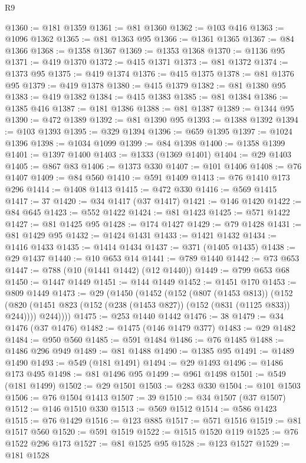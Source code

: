 \begin{lexlean}{R9}
\begin{coremodule}
@1360 := @181 @1359
@1361 := @81 @1360
@1362 := @103 @416
@1363 := @1096 @1362
@1365 := @81 @1363 @95
@1366 := @1361 @1365
@1367 := @84 @1366
@1368 := @1358 @1367
@1369 := @1353 @1368
@1370 := @1136 @95
@1371 := @419 @1370
@1372 := @415 @1371
@1373 := @81 @1372
@1374 := @1373 @95
@1375 := @419 @1374
@1376 := @415 @1375
@1378 := @81 @1376 @95
@1379 := @419 @1378
@1380 := @415 @1379
@1382 := @81 @1380 @95
@1383 := @419 @1382
@1384 := @415 @1383
@1385 := @81 @1384
@1386 := @1385 @416
@1387 := @181 @1386
@1388 := @81 @1387
@1389 := @1344 @95
@1390 := @472 @1389
@1392 := @81 @1390 @95
@1393 := @1388 @1392
@1394 := @103 @1393
@1395 := @329 @1394
@1396 := @659 @1395
@1397 := @1024 @1396
@1398 := @1034 @1099
@1399 := @84 @1398
@1400 := @1358 @1399
@1401 := @1397 @1400
@1403 := @1333 (@1369 @1401)
@1404 := @29 @1403
@1405 := @867 @83
@1406 := @1373 @330
@1407 := @101 @1406
@1408 := @76 @1407
@1409 := @84 @560
@1410 := @591 @1409
@1413 := @76 @1410 @173 @296
@1414 := @1408 @1413
@1415 := @472 @330
@1416 := @569 @1415
@1417 := 37
@1420 := @34 @1417 (@37 @1417)
@1421 := @146 @1420
@1422 := @84 @645
@1423 := @552 @1422
@1424 := @81 @1423
@1425 := @571 @1422
@1427 := @81 @1425 @95
@1428 := @174 @1427
@1429 := @79 @1428
@1431 := @81 @1429 @95
@1432 := @1424 @1431
@1433 := @1421 @1432
@1434 := @1416 @1433
@1435 := @1414 @1434
@1437 := @371 (@1405 @1435)
@1438 := @29 @1437
@1440 := @10 @653 @14
@1441 := @789 @1440
@1442 := @73 @653
@1447 := @788 (@10 (@1441 @1442) (@12 @1440))
@1449 := @799 @653 @68
@1450 := @1447 @1449
@1451 := @144 @1449
@1452 := @1451 @170
@1453 := @809 @1449
@1473 := @29
    (@1450
      (@1452
        (@152
          (@807 (@1453 @813))
          (@152
            (@820 (@1451 @823 (@152 (@238 (@1453 @827)) (@152 (@831 (@1125 @833)) @244))))
            @244))))
@1475 := @253 @1440 @1442
@1476 := 38
@1479 := @34 @1476 (@37 @1476)
@1482 := @1475 (@146 @1479 @377)
@1483 := @29 @1482
@1484 := @950 @560
@1485 := @591 @1484
@1486 := @76 @1485
@1488 := @1486 @296 @949
@1489 := @81 @1488
@1490 := @1385 @95
@1491 := @1489 @1490
@1493 := @549 (@181 @1491)
@1494 := @29 @1493
@1496 := @1486 @173 @495
@1498 := @81 @1496 @95
@1499 := @961 @1498
@1501 := @549 (@181 @1499)
@1502 := @29 @1501
@1503 := @283 @330
@1504 := @101 @1503
@1506 := @76 @1504 @1413
@1507 := 39
@1510 := @34 @1507 (@37 @1507)
@1512 := @146 @1510 @330
@1513 := @569 @1512
@1514 := @586 @1423
@1515 := @76 @1429
@1516 := @123 @885
@1517 := @571 @1516
@1519 := @81 @1517 @560
@1520 := @591 @1519
@1522 := @1515 @1520 @119
@1525 := @76 @1522 @296 @173
@1527 := @81 @1525 @95
@1528 := @123 @1527
@1529 := @181 @1528

\end{coremodule}
\end{lexlean}
